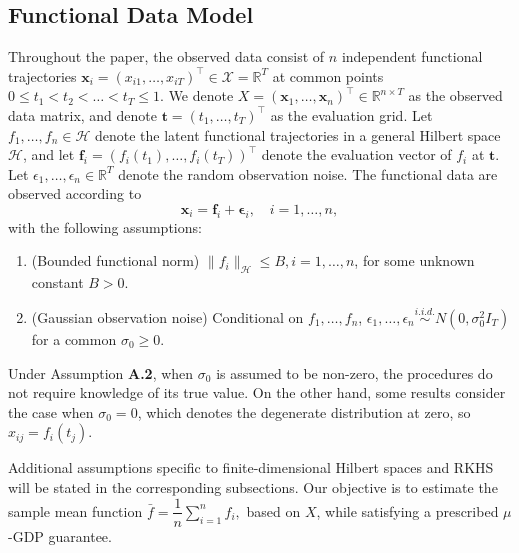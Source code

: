 \documentclass[twoside,11pt]{article}
\begin{document}
\subsection{Functional Data Model}
\label{subsec: functional data model}
Throughout the paper, the observed data consist of $n$ independent functional trajectories $\mathbf{x}_i=(x_{i1},\ldots,x_{iT})^\top\in\mathcal{X}=\mathbb{R}^T$ at common points $0\leq t_1<t_2<\ldots<t_T\leq 1$. We denote $X=(\mathbf{x}_1,\ldots,\mathbf{x}_n)^\top\in\mathbb R^{n\times T}$ as the observed data matrix, and denote $\mathbf{t} = (t_1,\ldots,t_T)^\top$ as the evaluation grid. Let $f_1,\ldots,f_n\in\mathcal H$ denote the latent functional trajectories in a general Hilbert space $\mathcal H$, and let $\mathbf{f}_i = (f_i(t_1),\ldots,f_i(t_T))^\top$ denote the evaluation vector of $f_i$ at $\mathbf{t}$. Let $\epsilon_1,\ldots,\epsilon_n\in \mathbb {R}^T$ denote the random observation noise. The functional data are observed according to
\begin{equation}
\mathbf{x}_i = \mathbf{f}_i + \mathbf{\epsilon}_i,\quad
i=1,\ldots,n,
\label{eq:data_generation}
\end{equation}
with the following assumptions:
\begin{enumerate} 
\item[\textbf{A.1}] (Bounded functional norm) $\|f_i\|_{\mathcal H}\le B, i=1,\ldots,n$, for some unknown constant $B>0$.
\item[\textbf{A.2}] (Gaussian observation noise) Conditional on $f_1,\ldots,f_n$, $\epsilon_1,\ldots,\epsilon_n \overset{i.i.d.}{\sim} N(0,\sigma_0^2I_T)$ for a common $\sigma_0\geq 0$.
\end{enumerate}
Under Assumption \textbf{A.2}, when $\sigma_0$ is assumed to be non-zero, the procedures do not require knowledge of its true value. On the other hand, some results consider the case when $\sigma_0=0$, which denotes the degenerate distribution at zero, so $x_{ij}=f_i(t_j)$.

Additional assumptions specific to finite-dimensional Hilbert spaces and RKHS will be stated in the corresponding subsections. Our objective is to estimate the sample mean function $\bar{f}=\dfrac{1}{n}\sum_{i=1}^nf_i,$ based on $X$, while satisfying a prescribed $\mu$-GDP guarantee.
\end{document}
